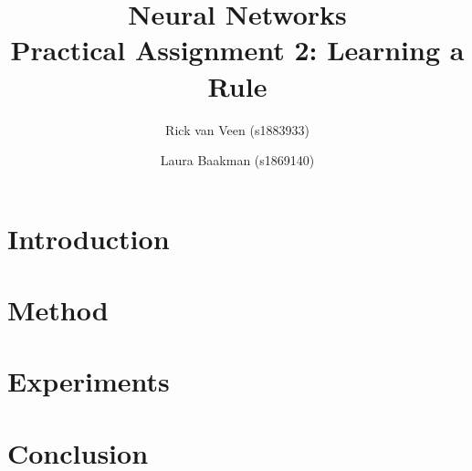 \documentclass[twoside, a4paper]{article}
\title{Neural Networks\\Practical Assignment 2: Learning a Rule}
\author{Rick van Veen (s1883933) \and Laura Baakman (s1869140)}
\begin{document}
\maketitle



\begin{multicols}{2}

\section{Introduction}

	
\section{Method}
	

\section{Experiments}
	

\section{Conclusion}


\printbibliography

\end{multicols}
\end{document}
